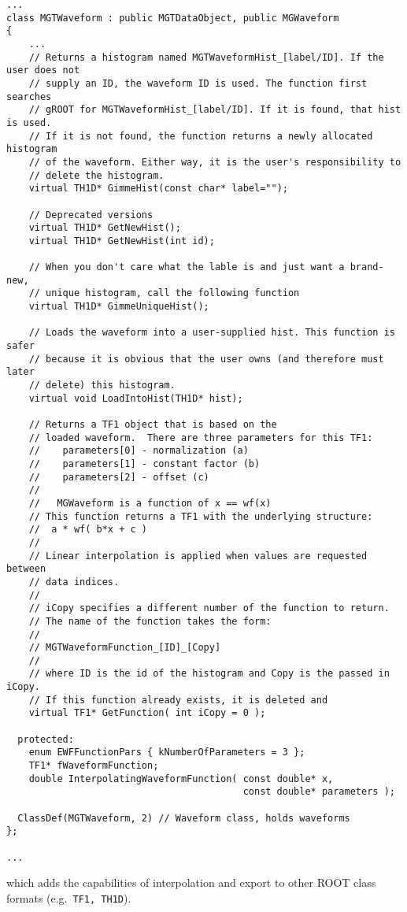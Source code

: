			\begin{lstlisting}[label=lst:RootWaveformExamp]
...
class MGTWaveform : public MGTDataObject, public MGWaveform
{
    ...
    // Returns a histogram named MGTWaveformHist_[label/ID]. If the user does not
    // supply an ID, the waveform ID is used. The function first searches
    // gROOT for MGTWaveformHist_[label/ID]. If it is found, that hist is used.
    // If it is not found, the function returns a newly allocated histogram 
    // of the waveform. Either way, it is the user's responsibility to
    // delete the histogram.
    virtual TH1D* GimmeHist(const char* label=""); 

    // Deprecated versions
    virtual TH1D* GetNewHist();
    virtual TH1D* GetNewHist(int id); 

    // When you don't care what the lable is and just want a brand-new,
    // unique histogram, call the following function
    virtual TH1D* GimmeUniqueHist(); 

    // Loads the waveform into a user-supplied hist. This function is safer
    // because it is obvious that the user owns (and therefore must later
    // delete) this histogram.
    virtual void LoadIntoHist(TH1D* hist);

    // Returns a TF1 object that is based on the       
    // loaded waveform.  There are three parameters for this TF1:
    //    parameters[0] - normalization (a)
    //    parameters[1] - constant factor (b)
    //    parameters[2] - offset (c)
    //    
    //   MGWaveform is a function of x == wf(x)
    // This function returns a TF1 with the underlying structure:
    //  a * wf( b*x + c )
    //  
    // Linear interpolation is applied when values are requested between 
    // data indices.
    //
    // iCopy specifies a different number of the function to return.
    // The name of the function takes the form:
    //
    // MGTWaveformFunction_[ID]_[Copy] 
    //
    // where ID is the id of the histogram and Copy is the passed in iCopy.
    // If this function already exists, it is deleted and  
    virtual TF1* GetFunction( int iCopy = 0 );

  protected:
    enum EWFFunctionPars { kNumberOfParameters = 3 }; 
    TF1* fWaveformFunction;
    double InterpolatingWaveformFunction( const double* x, 
                                          const double* parameters ); 

  ClassDef(MGTWaveform, 2) // Waveform class, holds waveforms
};

...			\end{lstlisting}		
which adds the capabilities of interpolation and export to 
other ROOT class formats (e.g.~\lstinline!TF1, TH1D!).

